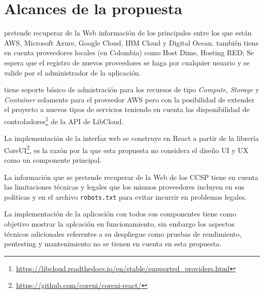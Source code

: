 \chapter{Alcances de la propuesta} %

\label{ch:alcances} %



\appName pretende recuperar de la Web información de los principales  entre los que están \acrshort{AWS}, \gls{Microsoft Azure}, \gls{Google Cloud}, \gls{IBM Cloud} y \gls{Digital Ocean}. \appName también tiene en cuenta proveedores locales (en Colombia) como \gls{Host Dime}, \gls{Hosting RED}; Se espera que el registro de nuevos proveedores se haga por cualquier usuario y se valide por el administrador de la aplicación.\bigskip

\appName tiene soporte básico de admistración para los recursos de tipo \emph{Compute}, \emph{Storage} y \emph{Container} solamente para el proveedor \acrshort{AWS} pero con la posibilidad de extender el proyecto a nuevos tipos de servicios teniendo en cuenta las disponibilidad de controladores\footnote{\url{https://libcloud.readthedocs.io/en/stable/supported_providers.html}} de la API de \gls{LibCloud}. \bigskip

La implementación de la interfaz web se construye en \gls{React} a partir de la librería \gls{CoreUI}\footnote{\url{https://github.com/coreui/coreui-react/}}, es la razón por la que esta propuesta no considera el diseño \acrshort{UI} y \acrshort{UX} como un componente principal.\bigskip

La información que se pretende recuperar de la Web de los \acrshort{CCSP} tiene en cuenta las limitaciones técnicas y legales que los mismos proveedores incluyen en sus politicas y en el archivo \texttt{robots.txt} para evitar incurrir en problemas legales. \bigskip

La implementación de la aplicación con todos sus componentes tiene como objetivo mostrar la aplcación en funcionamiento, sin embargo los aspectos técnicos adicionales referentes a su despliegue como pruebas de rendimiento, pentesting y mantenimiento no se tienen en cuenta en esta propuesta.